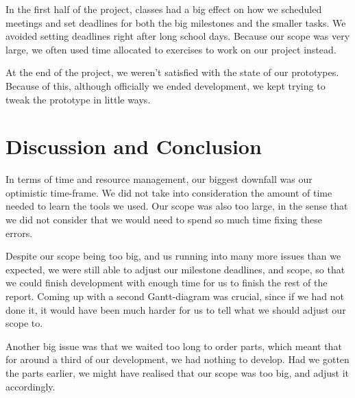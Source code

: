 In the first half of the project, classes had a big effect on how we scheduled meetings and set deadlines for both the big milestones and the smaller tasks. We avoided setting deadlines right after long school days. Because our scope was very large, we often used time allocated to exercises to work on our project instead.

At the end of the project, we weren't satisfied with the state of our prototypes. Because of this, although officially we ended development, we kept trying to tweak the prototype in little ways.

\clearpage
\section{Discussion and Conclusion}

In terms of time and resource management, our biggest downfall was our optimistic time-frame. We did not take into consideration the amount of time needed to learn the tools we used. Our scope was also too large, in the sense that we did not consider that we would need to spend so much time fixing these errors.

Despite our scope being too big, and us running into many more issues than we expected, we were still able to adjust our milestone deadlines, and scope, so that we could finish development with enough time for us to finish the rest of the report. Coming up with a second Gantt-diagram was crucial, since if we had not done it, it would have been much harder for us to tell what we should adjust our scope to.

Another big issue was that we waited too long to order parts, which meant that for around a third of our development, we had nothing to develop. Had we gotten the parts earlier, we might have realised that our scope was too big, and adjust it accordingly.

